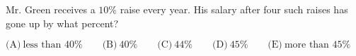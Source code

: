 

Mr. Green receives a $10\%$ raise every year. His salary after four such raises has gone up by what percent?

$\text{(A)}\ \text{less than }40\% \qquad \text{(B)}\ 40\% \qquad \text{(C)}\ 44\% \qquad \text{(D)}\ 45\% \qquad \text{(E)}\ \text{more than }45\%$
